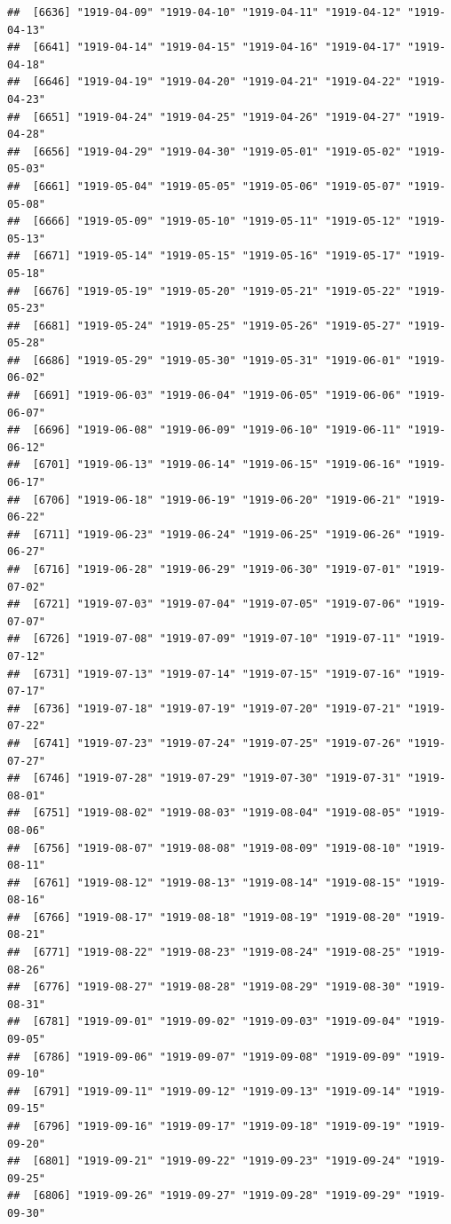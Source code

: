 \documentclass{article}\usepackage[]{graphicx}\usepackage[]{color}
\makeatletter
\newenvironment{kframe}{%
 \def\at@end@of@kframe{}%
 \ifinner\ifhmode%
  \def\at@end@of@kframe{\end{minipage}}%
  \begin{minipage}{\columnwidth}%
 \fi\fi%
 \def\FrameCommand##1{\hskip\@totalleftmargin \hskip-\fboxsep
 \colorbox{shadecolor}{##1}\hskip-\fboxsep
     \hskip-\linewidth \hskip-\@totalleftmargin \hskip\columnwidth}%
 \MakeFramed {\advance\hsize-\width
   \@totalleftmargin\z@ \linewidth\hsize
   \@setminipage}}%
 {\par\unskip\endMakeFramed%
 \at@end@of@kframe}
\newenvironment{knitrout}{}{} %
\makeatother
\begin{document}
\begin{description}
\begin{knitrout}
\begin{kframe}
\begin{verbatim}
##  [6636] "1919-04-09" "1919-04-10" "1919-04-11" "1919-04-12" "1919-04-13"
##  [6641] "1919-04-14" "1919-04-15" "1919-04-16" "1919-04-17" "1919-04-18"
##  [6646] "1919-04-19" "1919-04-20" "1919-04-21" "1919-04-22" "1919-04-23"
##  [6651] "1919-04-24" "1919-04-25" "1919-04-26" "1919-04-27" "1919-04-28"
##  [6656] "1919-04-29" "1919-04-30" "1919-05-01" "1919-05-02" "1919-05-03"
##  [6661] "1919-05-04" "1919-05-05" "1919-05-06" "1919-05-07" "1919-05-08"
##  [6666] "1919-05-09" "1919-05-10" "1919-05-11" "1919-05-12" "1919-05-13"
##  [6671] "1919-05-14" "1919-05-15" "1919-05-16" "1919-05-17" "1919-05-18"
##  [6676] "1919-05-19" "1919-05-20" "1919-05-21" "1919-05-22" "1919-05-23"
##  [6681] "1919-05-24" "1919-05-25" "1919-05-26" "1919-05-27" "1919-05-28"
##  [6686] "1919-05-29" "1919-05-30" "1919-05-31" "1919-06-01" "1919-06-02"
##  [6691] "1919-06-03" "1919-06-04" "1919-06-05" "1919-06-06" "1919-06-07"
##  [6696] "1919-06-08" "1919-06-09" "1919-06-10" "1919-06-11" "1919-06-12"
##  [6701] "1919-06-13" "1919-06-14" "1919-06-15" "1919-06-16" "1919-06-17"
##  [6706] "1919-06-18" "1919-06-19" "1919-06-20" "1919-06-21" "1919-06-22"
##  [6711] "1919-06-23" "1919-06-24" "1919-06-25" "1919-06-26" "1919-06-27"
##  [6716] "1919-06-28" "1919-06-29" "1919-06-30" "1919-07-01" "1919-07-02"
##  [6721] "1919-07-03" "1919-07-04" "1919-07-05" "1919-07-06" "1919-07-07"
##  [6726] "1919-07-08" "1919-07-09" "1919-07-10" "1919-07-11" "1919-07-12"
##  [6731] "1919-07-13" "1919-07-14" "1919-07-15" "1919-07-16" "1919-07-17"
##  [6736] "1919-07-18" "1919-07-19" "1919-07-20" "1919-07-21" "1919-07-22"
##  [6741] "1919-07-23" "1919-07-24" "1919-07-25" "1919-07-26" "1919-07-27"
##  [6746] "1919-07-28" "1919-07-29" "1919-07-30" "1919-07-31" "1919-08-01"
##  [6751] "1919-08-02" "1919-08-03" "1919-08-04" "1919-08-05" "1919-08-06"
##  [6756] "1919-08-07" "1919-08-08" "1919-08-09" "1919-08-10" "1919-08-11"
##  [6761] "1919-08-12" "1919-08-13" "1919-08-14" "1919-08-15" "1919-08-16"
##  [6766] "1919-08-17" "1919-08-18" "1919-08-19" "1919-08-20" "1919-08-21"
##  [6771] "1919-08-22" "1919-08-23" "1919-08-24" "1919-08-25" "1919-08-26"
##  [6776] "1919-08-27" "1919-08-28" "1919-08-29" "1919-08-30" "1919-08-31"
##  [6781] "1919-09-01" "1919-09-02" "1919-09-03" "1919-09-04" "1919-09-05"
##  [6786] "1919-09-06" "1919-09-07" "1919-09-08" "1919-09-09" "1919-09-10"
##  [6791] "1919-09-11" "1919-09-12" "1919-09-13" "1919-09-14" "1919-09-15"
##  [6796] "1919-09-16" "1919-09-17" "1919-09-18" "1919-09-19" "1919-09-20"
##  [6801] "1919-09-21" "1919-09-22" "1919-09-23" "1919-09-24" "1919-09-25"
##  [6806] "1919-09-26" "1919-09-27" "1919-09-28" "1919-09-29" "1919-09-30"

\end{verbatim}
\end{kframe}
\end{knitrout}
\end{description}
\end{document}
